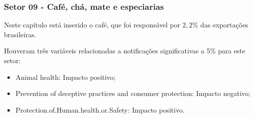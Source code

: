 % 
% 
%  
% 
% 
% 
% 
% 
%  
% 
% 
% 
% 
% 
%  
% 
% 
\newpage

\subsubsection{Setor 09 - Café, chá, mate e especiarias}


 

Neste capítulo está inserido o café, que foi responsável por $2,2\%$ das exportações brasileiras.

Houveram três variáveis relacionadas a notificações significativas a 5\% para este setor: 
\begin{itemize}
    \item Animal health: Impacto positivo;
    \item Prevention of deceptive practices and consumer protection: Impacto negativo;
    \item Protection.of.Human.health.or.Safety: Impacto positivo.
\end{itemize}

